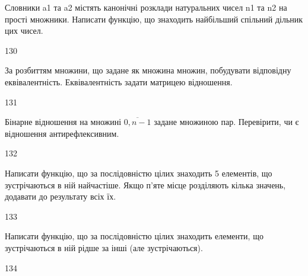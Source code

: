 Словники a1 та a2 містять канонічні розклади натуральних чисел n1 та n2 на прості множники. Написати функцію, що знаходить найбільший спільний дільник цих чисел.
\\\par
130 














За розбиттям множини, що задане як множина множин, побудувати відповідну еквівалентність. Еквівалентність задати матрицею відношення.
\\\par
131 














Бінарне відношення на множині $\overline{0,n-1}$ задане множиною пар. Перевірити, чи є відношення антирефлексивним.
\\\par
132 














Написати функцію, що за послідовністю цілих знаходить 5 елементів, що зустрічаються в ній найчастіше. Якщо п’яте місце розділяють кілька значень, додавати до результату всіх їх.
\\\par
133 














Написати функцію, що за послідовністю цілих знаходить елементи, що зустрічаються в ній рідше за інші (але зустрічаються).
\\\par
134 














